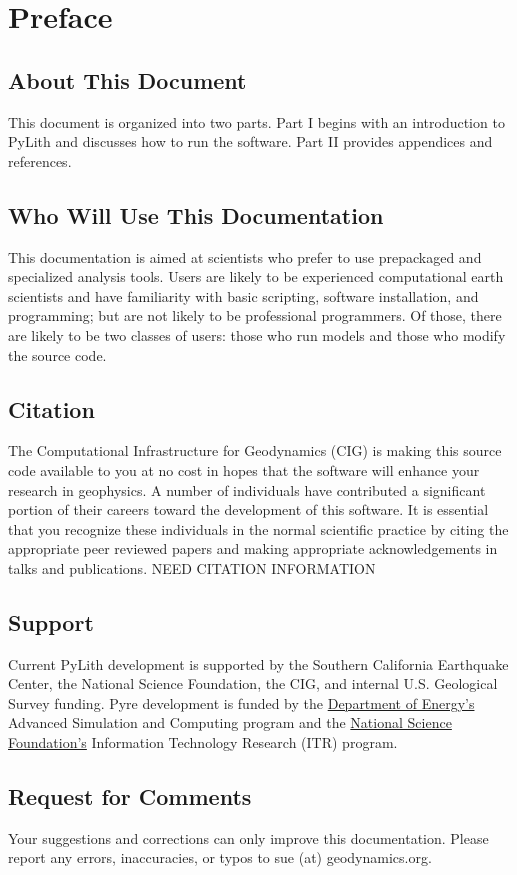 \chapter{Preface}

\section{About This Document}

This document is organized into two parts. Part I begins with an
introduction to PyLith and discusses how to run the software. Part II
provides appendices and references.

\section{Who Will Use This Documentation}

This documentation is aimed at scientists who prefer to use
prepackaged and specialized analysis tools. Users are likely to be
experienced computational earth scientists and have familiarity with
basic scripting, software installation, and programming; but are not
likely to be professional programmers. Of those, there are likely to
be two classes of users: those who run models and those who modify the
source code.

\section{Citation}

The Computational Infrastructure for Geodynamics (CIG) is making this
source code available to you at no cost in hopes that the software
will enhance your research in geophysics. A number of individuals have
contributed a significant portion of their careers toward the
development of this software. It is essential that you recognize these
individuals in the normal scientific practice by citing the
appropriate peer reviewed papers and making appropriate
acknowledgements in talks and publications. NEED CITATION INFORMATION

\section{Support}

Current PyLith development is supported by the Southern California
Earthquake Center, the National Science Foundation, the CIG, and
internal U.S. Geological Survey funding. Pyre development is funded by
the \href{http://www.doe.gov/engine/content.do}{Department of
  Energy's} Advanced Simulation and Computing program and the
\href{http://www.nsf.gov}{National Science Foundation's} Information
Technology Research (ITR) program.

\section{Request for Comments}

Your suggestions and corrections can only improve this documentation.
Please report any errors, inaccuracies, or typos to sue (at)
geodynamics.org.

